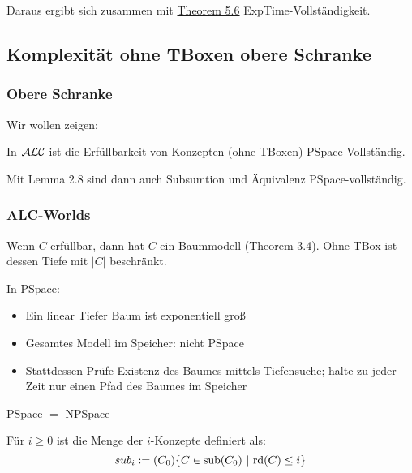 Daraus ergibt sich zusammen mit \protect\hyperlink{theorem-5.6}{Theorem 5.6} ExpTime-Vollständigkeit.

\subsection{Komplexität ohne TBoxen obere
Schranke}\label{komplexituxe4t-ohne-tboxen-obere-schranke}

\subsubsection{Obere Schranke}

Wir wollen zeigen:

\begin{theorem}
In $\mathcal{A}\mathcal{L}\mathcal{C}$ ist die Erfüllbarkeit von Konzepten (ohne TBoxen)
PSpace-Vollständig.
\end{theorem}

Mit Lemma 2.8 sind dann auch Subsumtion und Äquivalenz PSpace-vollständig.

\subsubsection{ALC-Worlds}\label{alc-worlds}

Wenn $C$ erfüllbar, dann hat $C$ ein Baummodell (Theorem 3.4). Ohne TBox ist dessen Tiefe mit $\left| C \right|$ beschränkt. 

In PSpace:

\begin{itemize}
\item
  Ein linear Tiefer Baum ist exponentiell groß
\item
  Gesamtes Modell im Speicher: nicht PSpace
\item
  Stattdessen Prüfe Existenz des Baumes mittels Tiefensuche; halte zu
  jeder Zeit nur einen Pfad des Baumes im Speicher
\end{itemize}

\begin{theorem}
PSpace $=$ NPSpace
\end{theorem}

\begin{definition}[$i$-Konzepte]

Für $i \geq 0$ ist die Menge der $i$-Konzepte definiert als:
$$sub_{i} := \left( C_{0} \right) \left\{ C \in \sub\left( C_{0} \right)\  \middle| \text{\ rd}\left( C \right) \leq i \right\}$$
\end{definition}

